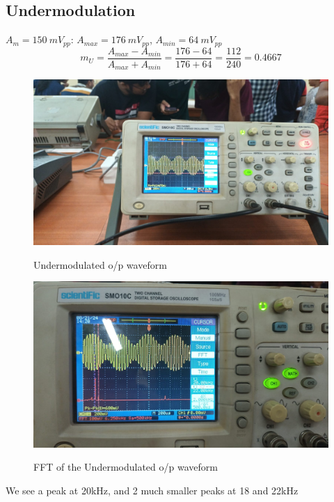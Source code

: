 \documentclass{article}
\begin{document}
\subsection{Undermodulation}
$A_m=150\ mV_{pp}$: $A_{max}=176 \ mV_{pp}$, $A_{min}=64\ mV_{pp}$
\begin{equation}
  m_{U}=\frac{A_{max}-A_{min}}{A_{max}+A_{min}}=\frac{176-64}{176+64}=\frac{112}{240}=0.4667
\end{equation}
\begin{figure}[!ht]
  \caption{Undermodulated o/p waveform}
\includegraphics[width=\textwidth]{Undermodulation.jpeg}
\label{fig:Undermodulation}
\end{figure}
\begin{figure}[!ht]
  \caption{FFT of the Undermodulated o/p waveform}
\includegraphics[width=\textwidth]{Undermodulation_FFT.jpeg}
\label{fig:Undermodulation_FFT}
\end{figure}
We see a peak at 20kHz, and 2 much smaller peaks at 18 and 22kHz
\clearpage
\end{document}
